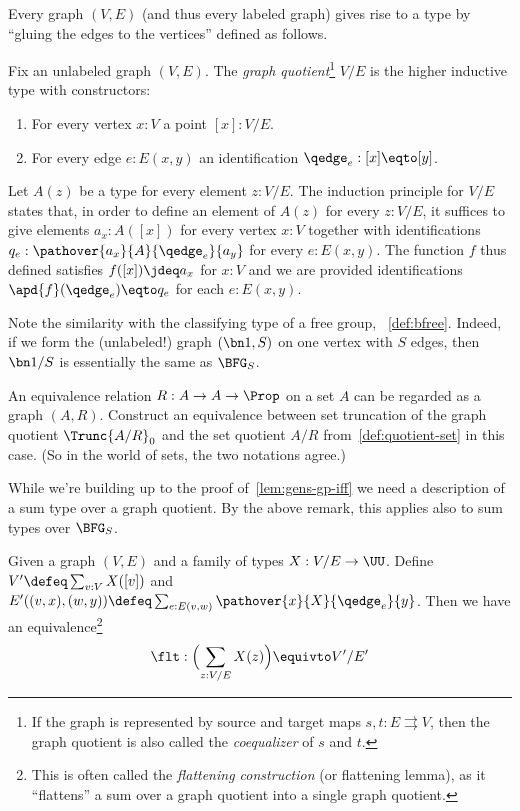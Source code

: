 Every graph $(V,E)$ (and thus every labeled graph) gives rise to a type
by ``gluing the edges to the vertices'' defined as follows.
\begin{definition}
  Fix an unlabeled graph $(V,E)$. The \emph{graph quotient}\footnote{%
    If the graph is represented by source and target maps
    $s,t: E \rightrightarrows V$, then the graph quotient is
  also called the \emph{coequalizer} of $s$ and $t$.} $V/E$ is
  the higher inductive type with constructors:
  \begin{enumerate}
  \item For every vertex $x : V$ a point $[x] : V/E$.
  \item For every edge $e : E(x,y)$ an identification $\qedge_e : [x] \eqto [y]$.
  \end{enumerate}

  Let $A(z)$ be a type for every element $z:V/E$. The induction principle
  for $V/E$ states that, in order to define an element of $A(z)$ for every $z:V/E$,
  it suffices to give elements $a_x : A([x])$ for every vertex $x:V$
  together with
  identifications $q_e : \pathover{a_x}{A}{\qedge_e}{a_y}$
  for every $e:E(x,y)$.
  The function $f$ thus defined satisfies $f([x])\jdeq a_x$ for $x:V$
  and we are provided identifications $\apd{f}(\qedge_e)\eqto q_e$ for each $e:E(x,y)$.
\end{definition}
\begin{remark}
  Note the similarity with the classifying type of a free group,
  \cf~\cref{def:bfree}. Indeed, if we form the (unlabeled!)
  graph $(\bn 1,S)$
  on one vertex with $S$ edges, then $\bn 1/S$ is essentially the same as $\BFG_S$.
\end{remark}
\begin{xca}
  An equivalence relation $R : A \to A \to \Prop$ on a set $A$
  can be regarded as a graph $(A,R)$.
  Construct an equivalence between set truncation of the graph quotient $\Trunc{A/R}_0$
  and the set quotient $A/R$ from~\cref{def:quotient-set} in this case.
  (So in the world of sets, the two notations agree.)
\end{xca}
While we're building up to the proof of~\cref{lem:gens-gp-iff} we need
a description of a sum type over a graph quotient.
By the above remark, this applies also to sum types over $\BFG_S$.
\begin{construction}\label{def:graph-quotient-flattening}
  Given a graph $(V,E)$ and a family of types $X : V/E \to \UU$.
  Define $V' \defeq \sum_{v:V}X([v])$ and
  $E'((v,x),(w,y)) \defeq \sum_{e:E(v,w)}\pathover{x}{X}{\qedge_e}{y}$.
  Then we have an equivalence\footnote{%
    This is often called the \emph{flattening construction} (or flattening lemma),
    as it ``flattens'' a sum over a graph quotient into a single graph quotient.}
  \[
    \flt : \Bigl(\sum_{z:V/E}X(z)\Bigr) \equivto V'/E'
  \]
\end{construction}
